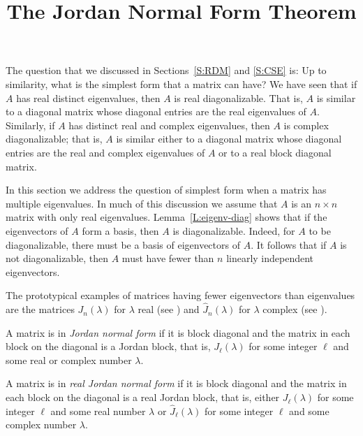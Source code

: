 \documentclass{ximera}
\title{The Jordan Normal Form Theorem}
\begin{document}
\begin{abstract}
\end{abstract}
\maketitle


\label{S:JNF}

The question that we discussed in Sections~\ref{S:RDM} and \ref{S:CSE} is: 
Up to similarity, what is the simplest form that a matrix can have?  
We have seen that if $A$ has real distinct eigenvalues, then $A$ is real 
diagonalizable.  That is, $A$ is similar to a diagonal matrix whose 
diagonal entries are the real eigenvalues of $A$.  Similarly, if $A$ has 
distinct real and complex eigenvalues, then $A$ is complex diagonalizable; 
that is, $A$ is similar either to a diagonal matrix whose diagonal entries 
are the real and complex eigenvalues of $A$ or to a real block diagonal 
matrix.

In this section we address the question of simplest form when a
matrix has multiple eigenvalues.  In much of this discussion we assume
that $A$ is an $n\times n$ matrix with only real eigenvalues.  
Lemma~\ref{L:eigenv-diag} shows that if the eigenvectors of 
$A$ form a basis, then $A$ is diagonalizable. Indeed, for $A$ to be
diagonalizable, there must be a basis of eigenvectors of $A$.  It 
follows that if $A$ is not diagonalizable, then $A$ must have fewer
than $n$ linearly independent 
eigenvectors.  

The prototypical examples of matrices having fewer eigenvectors than 
eigenvalues are the matrices $J_n(\lambda)$ for $\lambda$ real (see
) and $\widehat{J}_n(\lambda)$ for $\lambda$ complex (see
).
\begin{definition} 
A matrix is in {\em Jordan normal form\/} if it is block diagonal and 
the matrix in each block on the diagonal is a Jordan block, that is, 
$J_\ell(\lambda)$ for some integer $\ell$ and some real or complex number 
$\lambda$.  

A matrix is in {\em real Jordan normal form\/} if it is block diagonal 
and the matrix in each block on the diagonal is a real Jordan block, that is, 
either $J_\ell(\lambda)$ for some integer $\ell$ and some real number 
$\lambda$ or $\widehat{J}_\ell(\lambda)$ for some integer $\ell$ and some 
complex number $\lambda$. 
\end{definition} 
\end{document}
